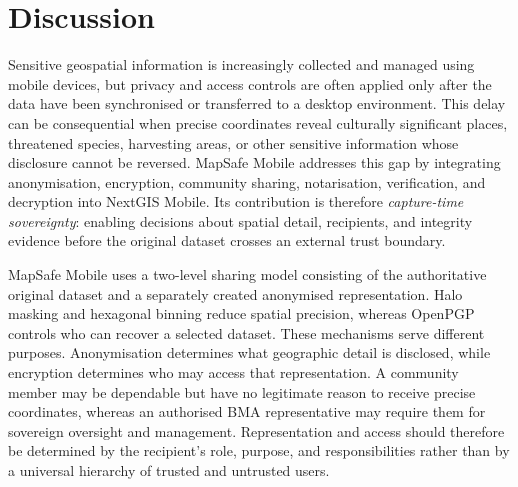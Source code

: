 \documentclass[]{interact}
\begin{document}
%
%

\section{Discussion}
\label{sec:discussion}

Sensitive geospatial information is increasingly collected and managed using mobile devices, but privacy and access controls are often applied only after the data have been synchronised or transferred to a desktop environment. This delay can be consequential when precise coordinates reveal culturally significant places, threatened species, harvesting areas, or other sensitive information whose disclosure cannot be reversed. MapSafe Mobile addresses this gap by integrating anonymisation, encryption, community sharing, notarisation, verification, and decryption into NextGIS Mobile. Its contribution is therefore \emph{capture-time sovereignty}: enabling decisions about spatial detail, recipients, and integrity evidence before the original dataset crosses an external trust boundary.

MapSafe Mobile uses a two-level sharing model consisting of the authoritative original dataset and a separately created anonymised representation. Halo masking and hexagonal binning reduce spatial precision, whereas OpenPGP controls who can recover a selected dataset. These mechanisms serve different purposes. Anonymisation determines what geographic detail is disclosed, while encryption determines who may access that representation. A community member may be dependable but have no legitimate reason to receive precise coordinates, whereas an authorised BMA representative may require them for sovereign oversight and management. Representation and access should therefore be determined by the recipient's role, purpose, and responsibilities rather than by a universal hierarchy of trusted and untrusted users.
\end{document}
